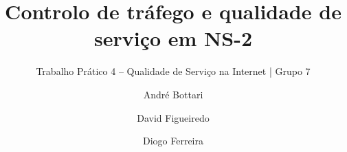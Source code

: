 \documentclass[runningheads]{llncs}
\begin{document}
\renewcommand{\keywordname}{{\bfseries Palavras-chave:}}
\title{Controlo de tráfego e qualidade de serviço em NS-2}
\subtitle{Trabalho Prático 4 -- Qualidade de Serviço na Internet | Grupo 7}

\author{André Bottari \and David Figueiredo \and Diogo Ferreira}
\authorrunning{}
\maketitle
\end{document}
